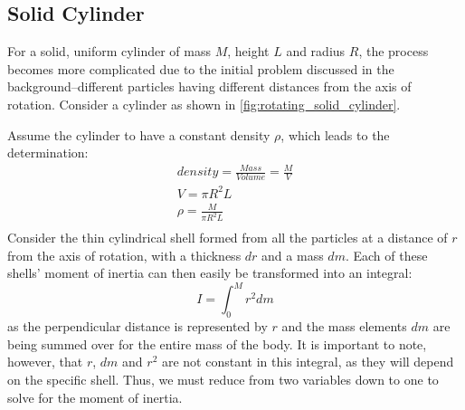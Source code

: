 \subsection{Solid Cylinder}

For a solid, uniform cylinder of mass $M$, height $L$ and radius $R$, the process becomes more complicated due to the initial problem discussed in the background--different particles having different distances from the axis of rotation. Consider a cylinder as shown in \cref{fig:rotating_solid_cylinder}.



Assume the cylinder to have a constant density $\rho$, which leads to the determination:
\begin{gather*}
density = \frac{Mass}{Volume} = \frac{M}{V} \\
V = \pi R^2L \\
\rho = \frac{M}{\pi R^2L}\\
\end{gather*}
Consider the thin cylindrical shell formed from all the particles at a distance of $r$ from the axis of rotation, with a thickness $dr$ and a mass $dm$. Each of these shells' moment of inertia can then easily be transformed into an integral:
\begin{equation}
I = \int_0^M r^2dm
\end{equation}
as the perpendicular distance is represented by $r$ and the mass elements $dm$ are being summed over for the entire mass of the body. It is important to note, however, that $r$, $dm$ and $r^2$ are not constant in this integral, as they will depend on the specific shell. Thus, we must reduce from two variables down to one to solve for the moment of inertia.

